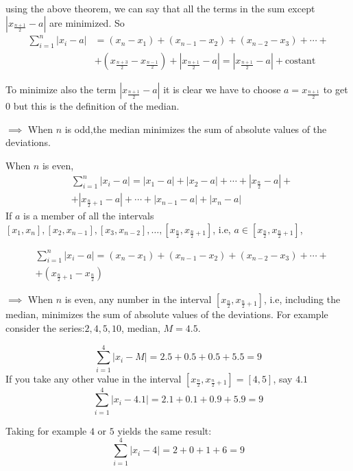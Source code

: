 \documentclass[12pt, letterpaper]{article}
\theoremstyle{definition}
\begin{document}
using the above theorem, we can say that all the terms in the sum except $\left|x_{\tfrac{n+1}{2}}-a\right|$ are minimized. So
\begin{equation}
\begin{aligned}
\sum_{i=1}^n|x_i-a|&=(x_n-x_1)+(x_{n-1}-x_2)+(x_{n-2}-x_3)+\cdots +\\
& +\left(x_{\tfrac{n+3}{2}}-x_{\tfrac{n-1}{2}}\right) + \left|x_{\tfrac{n+1}{2}}-a\right| = \left|x_{\tfrac{n+1}{2}}-a \right|+\text{costant}
\end{aligned}
\end{equation}

To minimize also the term $\left|x_{\tfrac{n+1}{2}}-a \right|$ it is clear we have to choose $a=x_{\tfrac{n+1}{2}}$ to get $0$ but this is the definition of the median.

$\implies$ When $n$ is odd,the median minimizes the sum of absolute values of the deviations.

When $n$ is even,
\begin{equation}
\begin{aligned}
&\sum_{i=1}^n|x_i-a|=|x_1-a|+|x_2-a|+\cdots+|x_{\tfrac{n}{2}}-a|+\\
&+|x_{\tfrac{n}{2}+1}-a|+ \cdots+|x_{n-1}-a|+|x_n-a|
\end{aligned}
\end{equation}
If $a$ is a member of all the intervals $[x_1,x_n], [x_2,x_{n-1}], [x_3,x_{n-2}], \ldots, \left[x_{\tfrac{n}{2}},x_{\tfrac{n}{2}+1}\right]$, i.e, $a\in\left[x_{\tfrac{n}{2}},x_{\tfrac{n}{2}+1}\right]$,

\begin{equation}
\begin{aligned}
&\sum_{i=1}^n|x_i-a|=(x_n-x_1)+(x_{n-1}-x_2)+(x_{n-2}-x_3)+\cdots + \\
&+\left(x_{\tfrac{n}{2}+1}-x_{\tfrac{n}{2}}\right)
\end{aligned}
\end{equation}

$\implies$ When $n$ is even, any number in the interval $[x_{\tfrac{n}{2}},x_{\tfrac{n}{2}+1}]$, i.e, including the median, minimizes the sum of absolute values of the deviations. For example consider the series:$2, 4, 5, 10$, median, $M=4.5$.

$$
\sum_{i=1}^4|x_i-M|=2.5+0.5+0.5+5.5=9
$$
If you take any other value in the interval $\left[x_{\tfrac{n}{2}},x_{\tfrac{n}{2} + 1} \right] =[4,5]$, say $4.1$
$$
\sum_{i=1}^4|x_i-4.1|=2.1+0.1+0.9+5.9=9
$$

Taking for example $4$ or $5$ yields the same result:
$$
\sum_{i=1}^4|x_i-4|=2+0+1+6=9
$$
\end{document}
